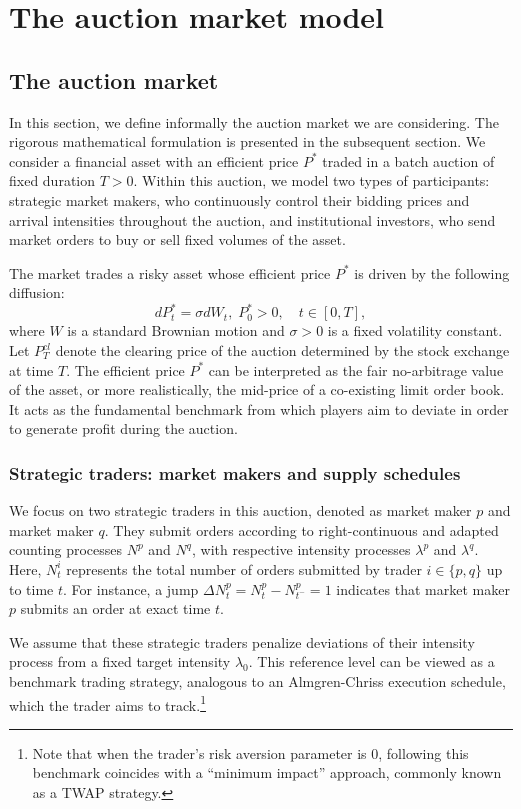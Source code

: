 \documentclass[12pt]{article}
\begin{document}
\section{The auction market model}
\label{sec:model}

\subsection{The auction market}
In this section, we define informally the auction market we are considering. The rigorous mathematical formulation is presented in the subsequent section. We consider a financial asset with an efficient price $P^*$ traded in a batch auction of fixed duration $T>0$. Within this auction, we model two types of participants: strategic market makers, who continuously control their bidding prices and arrival intensities throughout the auction, and institutional investors, who send market orders to buy or sell fixed volumes of the asset.\newline 

The market trades a risky asset whose efficient price $P^*$ is driven by the following diffusion: 
$$d P_t^* = \sigma dW_t,\; P_0^*>0, \quad t \in [0,T],$$ 
where $W$ is a standard Brownian motion and $\sigma>0$ is a fixed volatility constant. Let $P_T^{cl}$ denote the clearing price of the auction determined by the stock exchange at time $T$. The efficient price $P^*$ can be interpreted as the fair no-arbitrage value of the asset, or more realistically, the mid-price of a co-existing limit order book. It acts as the fundamental benchmark from which players aim to deviate in order to generate profit during the auction.
\vspace{0.5em}

\subsubsection{Strategic traders: market makers and supply schedules}
We focus on two strategic traders in this auction, denoted as market maker $p$ and market maker $q$. They submit orders according to right-continuous and adapted counting processes $N^p$ and $N^q$, with respective intensity processes $\lambda^p$ and $\lambda^q$. Here, $N^i_t$ represents the total number of orders submitted by trader $i \in \{p,q\}$ up to time $t$. For instance, a jump $\Delta N^p_t = N^p_t - N^p_{t^-} = 1$ indicates that market maker $p$ submits an order at exact time $t$. 

We assume that these strategic traders penalize deviations of their intensity process from a fixed target intensity $\lambda_0$. This reference level can be viewed as a benchmark trading strategy, analogous to an Almgren-Chriss execution schedule, which the trader aims to track.\footnote{Note that when the trader's risk aversion parameter is $0$, following this benchmark coincides with a ``minimum impact'' approach, commonly known as a TWAP strategy.} 
\end{document}
